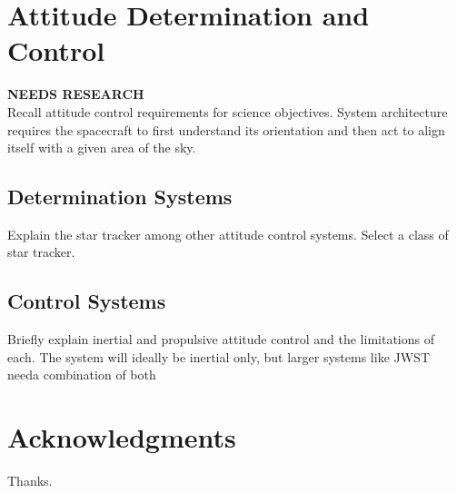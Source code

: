 \documentclass{ws-jai}
\begin{document}
\section{Attitude Determination and Control}
\textbf{NEEDS RESEARCH}\\
Recall attitude control requirements for science objectives. System architecture requires the spacecraft to first understand its orientation and then act to align itself with a given area of the sky.

\subsection{Determination Systems}
Explain the star tracker among other attitude control systems. Select a class of star tracker.

\subsection{Control Systems}
Briefly explain inertial and propulsive attitude control and the limitations of each. The system will ideally be inertial only, but larger systems like JWST needa combination of both

\section*{Acknowledgments}
Thanks.


\end{document}
